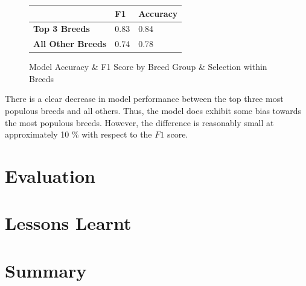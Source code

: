 \documentclass{article}
\begin{document}
\begin{figure}[]

\begin{center}

\begin{tabular}{|l|l|l|}
\hline
                          & \textbf{F1} & \textbf{Accuracy} \\ \hline
\textbf{Top 3 Breeds}     & 0.83        & 0.84              \\ \hline
\textbf{All Other Breeds} & 0.74        & 0.78              \\ \hline
\end{tabular}
\end{center}
\caption{Model Accuracy \& F1 Score by Breed Group & Selection within Breeds}
\label{fig:x breed score in breed}
\end{figure}



\noident  There is a clear decrease in model performance between the top three most populous breeds and all others.  Thus, the model does exhibit some bias towards the most populous breeds.  However, the difference is reasonably small at approximately 10 \% with respect to the $F1$ score.



\section{Evaluation}

\section{Lessons Learnt}

\section{Summary}
\end{document}
